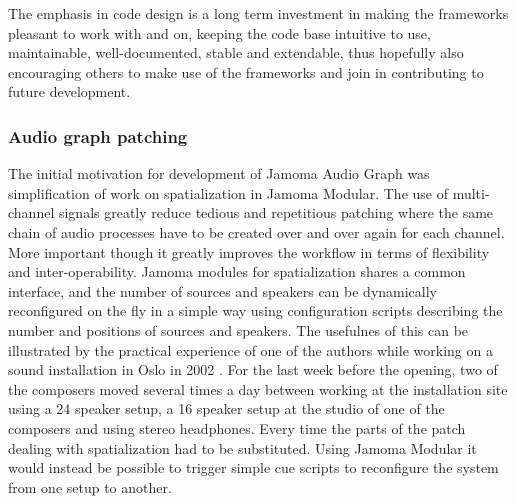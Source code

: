 \documentclass[twoside,a4paper]{article}
\begin{document}
The emphasis in code design is a long term investment in making the frameworks pleasant to work with and on, keeping the code base intuitive to use, maintainable, well-documented, stable and extendable, thus hopefully also encouraging others to make use of the frameworks and join in contributing to future development.



%
%
%


\subsubsection{Audio graph patching} %


The initial motivation for development of Jamoma Audio Graph was simplification of work on spatialization in Jamoma Modular. 
The use of multi-channel signals greatly reduce tedious and repetitious patching where the same chain of audio processes have to be created over and over again for each channel. 
More important though it greatly improves the workflow in terms of flexibility and inter-operability.
Jamoma modules for spatialization shares a common interface, and the number of sources and speakers can be dynamically reconfigured on the fly in a simple way using configuration scripts describing the number and positions of sources and speakers. 
The usefulnes of this can be illustrated by the practical experience of one of the authors while working on a sound installation in Oslo in 2002 \cite{Rudi:2003}.
For the last week before the opening, two of the composers moved several times a day between working at the installation site using a 24 speaker setup, a 16 speaker setup at the studio of one of the composers and using stereo headphones.
Every time the parts of the patch dealing with spatialization had to be substituted.
Using Jamoma Modular it would instead be possible to trigger simple cue scripts to reconfigure the system from one setup to another.
\end{document}
